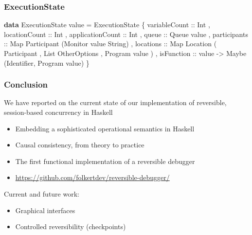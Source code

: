 \documentclass[12pt]{beamer}
\newenvironment{Shaded}{}{}
\newcommand{\KeywordTok}[1]{\textcolor[rgb]{0.00,0.44,0.13}{\textbf{#1}}}
\newcommand{\DataTypeTok}[1]{\textcolor[rgb]{0.56,0.13,0.00}{#1}}
\newcommand{\OtherTok}[1]{\textcolor[rgb]{0.00,0.44,0.13}{#1}}
\newcommand{\FunctionTok}[1]{\textcolor[rgb]{0.02,0.16,0.49}{#1}}
\newcommand{\NormalTok}[1]{#1}
\begin{document}
\begin{frame}[fragile]
\frametitle{ExecutionState}

\begin{Shaded}
\begin{Highlighting}[]
\KeywordTok{data} \DataTypeTok{ExecutionState}\NormalTok{ value }\FunctionTok{=} 
    \DataTypeTok{ExecutionState} 
\NormalTok{        \{}\OtherTok{ variableCount ::} \DataTypeTok{Int}
\NormalTok{        ,}\OtherTok{ locationCount ::} \DataTypeTok{Int}
\NormalTok{        ,}\OtherTok{ applicationCount ::} \DataTypeTok{Int}
\NormalTok{        ,}\OtherTok{ queue ::} \DataTypeTok{Queue}\NormalTok{ value}
\NormalTok{        ,}\OtherTok{ participants ::} \DataTypeTok{Map} \DataTypeTok{Participant}\NormalTok{ (}\DataTypeTok{Monitor}\NormalTok{ value }\DataTypeTok{String}\NormalTok{)}
\NormalTok{        ,}\OtherTok{ locations ::} \DataTypeTok{Map} \DataTypeTok{Location}
                \NormalTok{( }\DataTypeTok{Participant}
                \NormalTok{, }\DataTypeTok{List} \DataTypeTok{OtherOptions}
                \NormalTok{, }\DataTypeTok{Program}\NormalTok{ value}
                \NormalTok{) }
\NormalTok{        ,}\OtherTok{ isFunction ::}\NormalTok{ value }\OtherTok{->} \DataTypeTok{Maybe}\NormalTok{ (}\DataTypeTok{Identifier}\NormalTok{, }\DataTypeTok{Program}\NormalTok{ value)}
\NormalTok{        \}}
\end{Highlighting}
\end{Shaded}

\end{frame}


\begin{frame}[fragile]
\frametitle{Conclusion}

We have reported on the current state of our implementation of reversible, session-based concurrency in Haskell
\begin{itemize}
    \item Embedding a sophisticated operational semantics in Haskell
    \item Causal consistency, from theory to practice
    \item The first functional implementation of a reversible debugger
    \item \url{https://github.com/folkertdev/reversible-debugger/}
\end{itemize}

\smallskip

Current and future work:
\begin{itemize}
    \item Graphical interfaces
    \item Controlled reversibility (checkpoints)
\end{itemize}

\end{frame}
\end{document}
